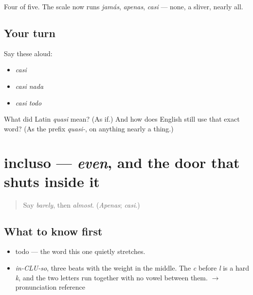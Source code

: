 \begin{grammarlens}[title={What you've built}]
Four of five. The scale now runs \emph{jamás}, \emph{apenas}, \emph{casi} — none, a sliver, nearly all.
\end{grammarlens}

\subsection*{Your turn}
Say these aloud:

\begin{itemize}
\raggedright
  \item \emph{casi}
  \item \emph{casi nada}
  \item \emph{casi todo}
\end{itemize}

\begin{tcolorbox}[breakable,colback=teal!4,colframe=teal!35!black,title={Before you move on}]
What did Latin \emph{quasi} mean? (As if.) And how does English still use that exact word? (As the prefix \emph{quasi-}, on anything nearly a thing.)
\end{tcolorbox}
\section[incluso]{incluso — \emph{even}, and the door that shuts inside it}

\label{lesson:ES-C328-incluso}



\begin{quote}
Say \emph{barely}, then \emph{almost}. (\emph{Apenas}; \emph{casi}.)
\end{quote}

\subsection*{What to know first}
\begin{itemize}
\raggedright
  \item todo — the word this one quietly stretches.
\end{itemize}

\begin{sounds}
\begin{itemize}
\raggedright
  \item \emph{in-CLU-so}, three beats with the weight in the middle. The \emph{c} before \emph{l} is a hard \emph{k}, and the two letters run together with no vowel between them. $\to$ pronunciation reference
\end{itemize}
\end{sounds}

